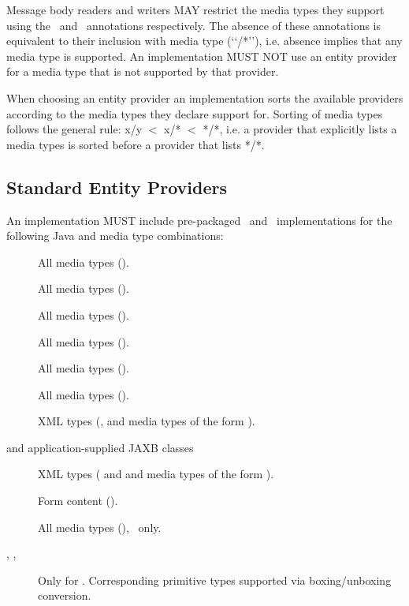 Message body readers and writers MAY restrict the media types they support using the \Consumes\ and \Produces\ annotations respectively. The absence of these annotations is equivalent to their inclusion with media type (\lq\lq*/*\rq\rq), i.e. absence implies that any media type is supported. An implementation MUST NOT use an entity provider for a media type that is not supported by that provider.

When choosing an entity provider an implementation sorts the available providers according to the media types they declare support for. Sorting of media types follows the general rule: x/y $<$ x/* $<$ */*, i.e. a provider that explicitly lists a media types is sorted before a provider that lists */*.

\subsection{Standard Entity Providers}
\label{standard_entity_providers}
 
An implementation MUST include pre-packaged \MsgRead\ and \MsgWrite\ implementations for the following Java and media type combinations:

\begin{description}
\item[] All media types (\code{*/*}).
\item[] All media types (\code{*/*}).
\item[] All media types (\code{*/*}).
\item[] All media types (\code{*/*}).
\item[] All media types (\code{*/*}).
\item[] All media types (\code{*/*}).
\item[] XML types (,  and media types of the form ).
\item[ and application-supplied JAXB classes] XML types ( and  and media 
types of the form ).
\item[] Form content ().
\item[] All media types (\code{*/*}), \MsgWrite\ only.
\item[, ,  \label{primitive_types}] Only for . Corresponding primitive types supported via boxing/unboxing conversion.
\end{description}

